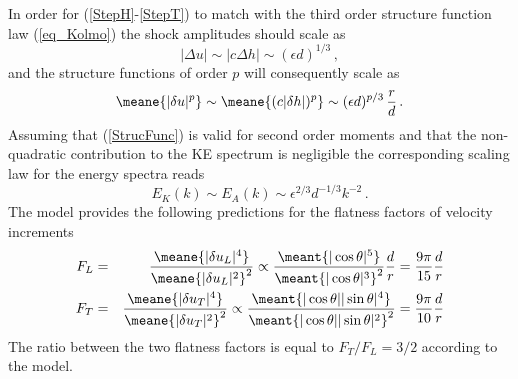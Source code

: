 In order for (\ref{StepH}-\ref{StepT}) to match with the third order structure function law (\ref{eq_Kolmo})  the shock amplitudes should scale as
\begin{equation} \label{Strength}
 | \Delta u | \sim | c \Delta h | \sim (\epsilon d)^{1/3} \, ,
\end{equation} 
and the structure functions of order $ p $ will consequently scale as
\begin{equation} \label{StrucFunc}
\meane{|\delta u |^p}  \sim \meane{(c|\delta h |)^p} \sim  (\epsilon  d)^{p/3} \,  \frac{r}{d} \, .
\end{equation} 
Assuming that (\ref{StrucFunc}) is valid for second order moments and that the non-quadratic contribution to the KE spectrum is negligible the corresponding scaling law for the energy spectra reads
\begin{equation} \label{Spectra}
E_K(k)  \sim  E_A(k) \sim \epsilon ^{2/3} d^{-1/3} k^{-2} \, .
\end{equation} 
The  model  provides the following predictions for the flatness factors of velocity increments
\begin{eqnarray} \label{FL}
F_L &=&  \frac{\meane{|\delta u_L|^4}}{\meane{|\delta u_L|^2}^2}
\propto 
\frac{\meant{|\cos\theta|^5}}{\meant{|\cos\theta|^3}^2} \frac{d}{r}   = \frac{9\pi}{15}  \frac{d}{r} \\ \label{FT}
F_T &=&  \frac{\meane{|\delta u_T|^4}}{\meane{|\delta u_T|^2}^2} 
\propto
\frac{\meant{|\cos\theta||\sin\theta|^4}}{\meant{|\cos\theta||\sin\theta|^2}^2} =  \frac{9\pi}{10}  \frac{d}{r} 
\end{eqnarray}
The ratio between the two flatness factors is equal  to
$F_T/F_L = 3/2$ according to the model. 


